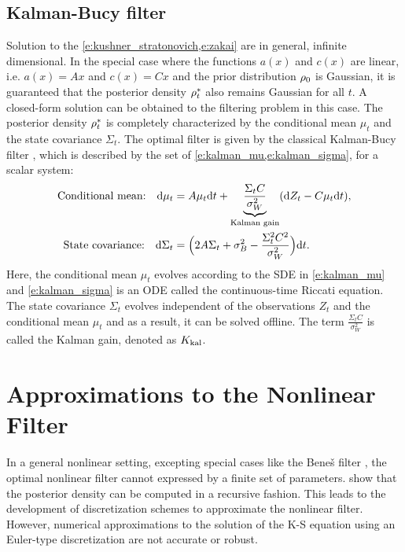 \subsection{Kalman-Bucy filter}
Solution to the \cref{e:kushner_stratonovich,e:zakai} are in general, infinite dimensional. In the special case where the functions $a(x)$ and $c(x)$ are linear, i.e. $a(x) = Ax$ and $c(x) = Cx$ and the prior distribution $\rho_0$ is Gaussian, it is guaranteed that the posterior density $\rho^*_t$ also remains Gaussian for all $t$. A closed-form solution can be obtained to the filtering problem in this case. The posterior density $\rho^*_t$ is completely characterized by the conditional mean $\mu_t$ and the state covariance $\Sigma_t$. The optimal filter is given by the classical Kalman-Bucy filter \cite{kal64}, which is described by the set of \cref{e:kalman_mu,e:kalman_sigma}, for a scalar system:
\begin{align}
\text{Conditional mean:} \quad \ud \mu_t & = A \mu_t \ud t + \underbrace{\frac{\Sigma_t C}{\sigma^2_W}}_{\text{Kalman gain}} ( \ud Z_t - C \mu_t \ud t), 
\label{e:kalman_mu} \\
\text{State covariance:}  \quad  \ud \Sigma_t &= \Bigl(2 A \Sigma_t + \sigma^2_B - \frac{\Sigma^2_t C^2}{\sigma^2_W} \Bigr) \ud t. 
\label{e:kalman_sigma}
\end{align}
Here, the conditional mean $\mu_t$ evolves according to the SDE in \eqref{e:kalman_mu} and \eqref{e:kalman_sigma} is an ODE called the continuous-time Riccati equation. The state covariance $\Sigma_t$ evolves independent of the observations $Z_t$ and the conditional mean $\mu_t$ and as a result, it can be solved offline.  
The term $\frac{\Sigma_t C}{\sigma^2_W}$ is called the Kalman gain, denoted as $K_{\text{kal}}$. 
\section{Approximations to the Nonlinear Filter}
\label{s:approx_nl_filter}
In a general nonlinear setting, excepting special cases like the Bene\v{s} filter \cite{ben81}, the optimal nonlinear filter cannot expressed by a finite set of parameters.  show that the posterior density can be computed in a recursive fashion. This leads to the development of discretization schemes to approximate the nonlinear filter. However, numerical approximations to the solution of the K-S equation using an Euler-type discretization are not accurate or robust. 

